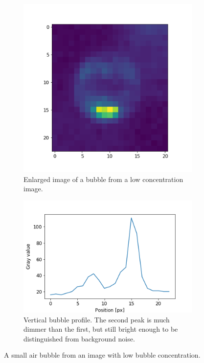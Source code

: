 		
		\begin{figure}
			\begin{subfigure}[t]{.3\textwidth}
				\centering
				\includegraphics[scale=.5]{images/one_peaks_color.png}
				\caption{Enlarged image of a bubble from a low concentration image. }
			\end{subfigure}\hfill
			\begin{subfigure}[t]{.4\textwidth}
				\includegraphics[scale=.5]{graphs/one_peaks_profile.png}
				\caption{Vertical bubble profile. The second peak is much dimmer than the first, but still bright enough to be distinguished from background noise.}
			\end{subfigure}
			\caption{A small air bubble from an image with low bubble concentration.}
			\label{fig:bubble_profile}
		\end{figure}
		

